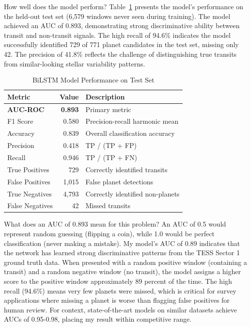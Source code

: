 \documentclass[letterpaper]{article} %
\begin{document}
How well does the model perform? Table~\ref{tab:bilstm_performance} presents the model's performance on the held-out test set (6,579 windows never seen during training). The model achieved an AUC of 0.893, demonstrating strong discriminative ability between transit and non-transit signals. The high recall of 94.6\% indicates the model successfully identified 729 of 771 planet candidates in the test set, missing only 42. The precision of 41.8\% reflects the challenge of distinguishing true transits from similar-looking stellar variability patterns.

\begin{table}[h]
    \centering
    \caption{BiLSTM Model Performance on Test Set}
    \label{tab:bilstm_performance}
    \begin{tabular}{@{}lrp{4cm}@{}}
        \toprule
        \textbf{Metric} & \textbf{Value} & \textbf{Description} \\
        \midrule
        \textbf{AUC-ROC} & \textbf{0.893} & Primary metric \\
                F1 Score & 0.580 & Precision-recall harmonic mean \\
                Accuracy & 0.839 & Overall classification accuracy \\
                Precision & 0.418 & TP / (TP + FP) \\
                Recall & 0.946 & TP / (TP + FN) \\
                True Positives & 729 & Correctly identified transits \\
                False Positives & 1,015 & False planet detections \\
                True Negatives & 4,793 & Correctly identified non-planets \\
                False Negatives & 42 & Missed transits \\
        \bottomrule
    \end{tabular}
\end{table}

What does an AUC of 0.893 mean for this problem? An AUC of 0.5 would represent random guessing (flipping a coin), while 1.0 would be perfect classification (never making a mistake). My model's AUC of 0.89 indicates that the network has learned strong discriminative patterns from the TESS Sector 1 ground truth data. When presented with a random positive window (containing a transit) and a random negative window (no transit), the model assigns a higher score to the positive window approximately 89 percent of the time. The high recall (94.6\%) means very few planets were missed, which is critical for survey applications where missing a planet is worse than flagging false positives for human review. For context, state-of-the-art models on similar datasets achieve AUCs of 0.95-0.98, placing my result within competitive range.
\end{document}
